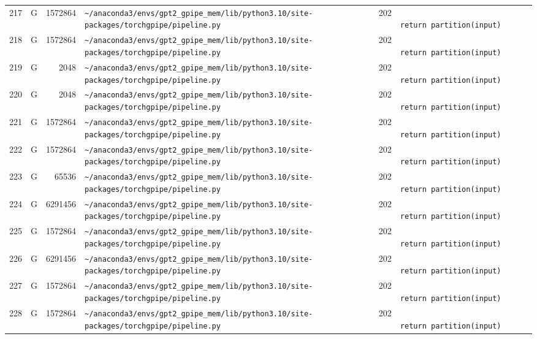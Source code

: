 \documentclass{article}
\begin{document}
\begin{longtable}{r l r p{6.5cm} r p{7.0cm}}
217 & G & 1572864 & \lstinline|~/anaconda3/envs/gpt2_gpipe_mem/lib/python3.10/site-packages/torchgpipe/pipeline.py| & 202 & \lstinline|                        return partition(input)| \\
218 & G & 1572864 & \lstinline|~/anaconda3/envs/gpt2_gpipe_mem/lib/python3.10/site-packages/torchgpipe/pipeline.py| & 202 & \lstinline|                        return partition(input)| \\
219 & G & 2048 & \lstinline|~/anaconda3/envs/gpt2_gpipe_mem/lib/python3.10/site-packages/torchgpipe/pipeline.py| & 202 & \lstinline|                        return partition(input)| \\
220 & G & 2048 & \lstinline|~/anaconda3/envs/gpt2_gpipe_mem/lib/python3.10/site-packages/torchgpipe/pipeline.py| & 202 & \lstinline|                        return partition(input)| \\
221 & G & 1572864 & \lstinline|~/anaconda3/envs/gpt2_gpipe_mem/lib/python3.10/site-packages/torchgpipe/pipeline.py| & 202 & \lstinline|                        return partition(input)| \\
222 & G & 1572864 & \lstinline|~/anaconda3/envs/gpt2_gpipe_mem/lib/python3.10/site-packages/torchgpipe/pipeline.py| & 202 & \lstinline|                        return partition(input)| \\
223 & G & 65536 & \lstinline|~/anaconda3/envs/gpt2_gpipe_mem/lib/python3.10/site-packages/torchgpipe/pipeline.py| & 202 & \lstinline|                        return partition(input)| \\
224 & G & 6291456 & \lstinline|~/anaconda3/envs/gpt2_gpipe_mem/lib/python3.10/site-packages/torchgpipe/pipeline.py| & 202 & \lstinline|                        return partition(input)| \\
225 & G & 1572864 & \lstinline|~/anaconda3/envs/gpt2_gpipe_mem/lib/python3.10/site-packages/torchgpipe/pipeline.py| & 202 & \lstinline|                        return partition(input)| \\
226 & G & 6291456 & \lstinline|~/anaconda3/envs/gpt2_gpipe_mem/lib/python3.10/site-packages/torchgpipe/pipeline.py| & 202 & \lstinline|                        return partition(input)| \\
227 & G & 1572864 & \lstinline|~/anaconda3/envs/gpt2_gpipe_mem/lib/python3.10/site-packages/torchgpipe/pipeline.py| & 202 & \lstinline|                        return partition(input)| \\
228 & G & 1572864 & \lstinline|~/anaconda3/envs/gpt2_gpipe_mem/lib/python3.10/site-packages/torchgpipe/pipeline.py| & 202 & \lstinline|                        return partition(input)| \\

\end{longtable}
\end{document}
